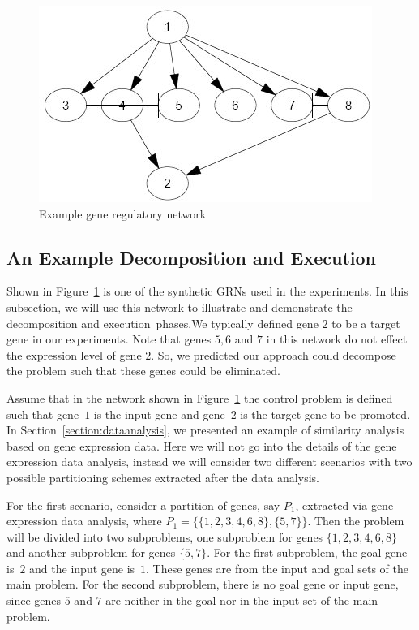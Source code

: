 \begin{figure}
\centering
  \includegraphics[scale=0.305]{experiments/grn1.jpg}
  \caption{Example gene regulatory network}\label{figure:grn1}
\end{figure}
\subsection{An Example Decomposition and Execution}
\label{section:example} Shown in Figure~\ref{figure:grn1} is one of the synthetic GRNs used in the
experiments. In this subsection, we will use this network to illustrate and demonstrate the decomposition and
execution~phases.We typically defined gene $2$ to be a target gene in our experiments. Note that genes $5,6$ and $7$ in this network do not effect the expression level of gene $2$. So, we predicted our approach could decompose the problem such that these genes could be eliminated.

Assume that in the network shown in Figure~\ref{figure:grn1} the control problem is defined such that
gene~$1$ is the input gene and gene~$2$ is the target gene to be promoted. In Section~\ref{section:dataanalysis},
we presented an example of similarity analysis based on gene expression data. Here we will not go into the
details of the gene expression data analysis, instead we will consider two different scenarios with two
possible partitioning schemes extracted after the data analysis.

For the first scenario, consider a partition of genes, say $P_1$, extracted via gene expression data
analysis, where $P_1 = \{\{1,2,3,4,6,8\},\{5,7\}\}$. Then the problem will be divided into two subproblems,
one subproblem for genes $\{1,2,3,4,6,8\}$ and another subproblem for genes $\{5,7\}$. For the first
subproblem, the goal gene is~$2$ and the input gene is~$1$. These genes are from the input and goal sets of
the main problem. For the second subproblem, there is no goal gene or input gene, since genes $5$ and $7$ are
neither in the goal nor in the input set of the main problem.

